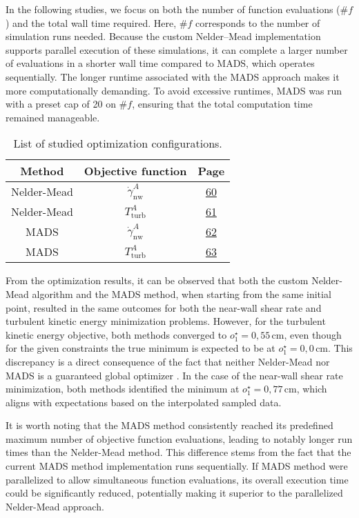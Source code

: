 In the following studies, we focus on both the number of function evaluations ($\#f$) and the total wall time required. Here, $\#f$ corresponds to the number of simulation runs needed. Because the custom Nelder–Mead implementation supports parallel execution of these simulations, it can complete a larger number of evaluations in a shorter wall time compared to MADS, which operates sequentially. The longer runtime associated with the MADS approach makes it more computationally demanding. To avoid excessive runtimes, MADS was run with a preset cap of 20 on $\#f$, ensuring that the total computation time remained manageable.

\begin{table}[H]
	\bgroup
	\centering
	\setlength\tabcolsep{3mm}
	\def\arraystretch{2.2}%
	\begin{tabular}{|c|c|c|}
		\hline
		\textbf{Method} & \textbf{Objective function} & \textbf{Page} \\ \hline
		Nelder-Mead & $\dot{\gamma}^{A}_{\mathrm{nw}}$ &\hyperlink{page.60}{60} \\ \hline
		Nelder-Mead & $T^{A}_{\mathrm{turb}}$ & \hyperlink{page.61}{61} \\ \hline
		MADS & $\dot{\gamma}^{A}_{\mathrm{nw}}$ & \hyperlink{page.62}{62} \\ \hline
		MADS & $T^{A}_{\mathrm{turb}}$ & \hyperlink{page.63}{63} \\ \hline
	\end{tabular}
	\caption{List of studied optimization configurations.}
	\label{tab:optim configs}
	\egroup
\end{table}

\newpage






From the optimization results, it can be observed that both the custom Nelder-Mead algorithm and the MADS method, when starting from the same initial point, resulted in the same outcomes for both the near-wall shear rate and turbulent kinetic energy minimization problems. However, for the turbulent kinetic energy objective, both methods converged to \(o_{1}^{\star} = 0{,}55\,\mathrm{cm}\), even though for the given constraints the true minimum is expected to be at \(o_{1}^{\star} = 0{,}0\,\mathrm{cm}\). This discrepancy is a direct consequence of the fact that neither Nelder-Mead nor MADS is a guaranteed global optimizer \cite{derivative-free-review}. In the case of the near-wall shear rate minimization, both methods identified the minimum at \(o_{1}^{\star} = 0{,}77\,\mathrm{cm}\), which aligns with expectations based on the interpolated sampled data.

It is worth noting that the MADS method consistently reached its predefined maximum number of objective function evaluations, leading to notably longer run times than the Nelder-Mead method. This difference stems from the fact that the current MADS method implementation runs sequentially. If MADS method were parallelized to allow simultaneous function evaluations, its overall execution time could be significantly reduced, potentially making it superior to the parallelized Nelder-Mead approach.